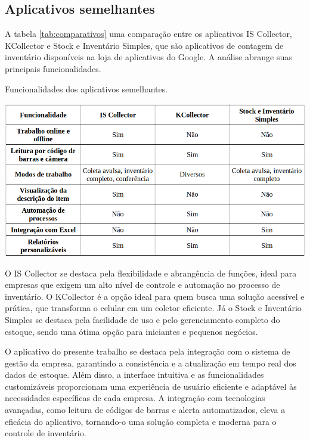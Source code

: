 \subsection{Aplicativos semelhantes}

A tabela \ref{tab:comparativos} uma comparação entre os aplicativos IS Collector, KCollector e Stock e Inventário Simples, que são aplicativos de contagem de inventário disponíveis na loja de aplicativos do Google. A análise abrange suas principais funcionalidades.

\begin{table}[!htb]
    \centering
    \caption{Funcionalidades dos aplicativos semelhantes.}
    \label{tab:comparativos}
    \includegraphics[width=1.0\textwidth]{tables/comparativo.png}
\end{table}

O IS Collector se destaca pela flexibilidade e abrangência de funções, ideal para empresas que exigem um alto nível de controle e automação no processo de inventário. O KCollector é a opção ideal para quem busca uma solução acessível e prática, que transforma o celular em um coletor eficiente. Já o Stock e Inventário Simples se destaca pela facilidade de uso e pelo gerenciamento completo do estoque, sendo uma ótima opção para iniciantes e pequenos negócios.

O aplicativo do presente trabalho se destaca pela integração com o sistema de gestão da empresa, garantindo a consistência e a atualização em tempo real dos dados de estoque. Além disso, a interface intuitiva e as funcionalidades customizáveis proporcionam uma experiência de usuário eficiente e adaptável às necessidades específicas de cada empresa. A integração com tecnologias avançadas, como leitura de códigos de barras e alerta automatizados, eleva a eficácia do aplicativo, tornando-o uma solução completa e moderna para o controle de inventário.
